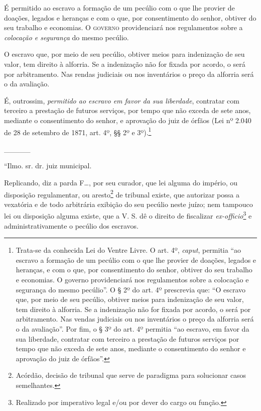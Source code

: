 É permitido ao escravo a formação de um pecúlio com o que lhe provier de
doações, legados e heranças e com o que, por consentimento do senhor,
obtiver do seu trabalho e economias. O \textsc{governo} providenciará nos
regulamentos sobre a \emph{colocação e segurança} do mesmo pecúlio.

O escravo que, por meio de seu pecúlio, obtiver meios para indenização
de seu valor, tem direito à alforria. Se a indenização não for fixada
por acordo, o será por arbitramento. Nas rendas judiciais ou nos
inventários o preço da alforria será o da avaliação.

É, outrossim, \emph{permitido ao escravo em favor da sua liberdade},
contratar com terceiro a prestação de futuros serviços, por tempo que
não exceda de sete anos, mediante o consentimento do senhor, e aprovação
do juiz de órfãos (Lei nº 2.040 de 28 de setembro de 1871, art. 4º, §§
2º e 3º).\footnote{ Trata-se da conhecida Lei do Ventre Livre. O art.
  4º, \emph{caput}, permitia ``ao escravo a formação de um pecúlio com o
  que lhe provier de doações, legados e heranças, e com o que, por
  consentimento do senhor, obtiver do seu trabalho e economias. O
  governo providenciará nos regulamentos sobre a colocação e segurança
  do mesmo pecúlio''. O § 2º do art. 4º prescrevia que: ``O escravo que,
  por meio de seu pecúlio, obtiver meios para indenização de seu valor,
  tem direito à alforria. Se a indenização não for fixada por acordo, o
  será por arbitramento. Nas vendas judiciais ou nos inventários o preço
  da alforria será o da avaliação''. Por fim, o § 3º do art. 4º permitia
  ``ao escravo, em favor da sua liberdade, contratar com terceiro a
  prestação de futuros serviços por tempo que não exceda de sete anos,
  mediante o consentimento do senhor e aprovação do juiz de órfãos''.}

\_\_\_\_\_

``Ilmo. sr. dr. juiz municipal.

Replicando, diz a parda F\ldots{}, por seu curador, que lei alguma do
império, ou disposição regulamentar, ou aresto\footnote{ Acórdão,
  decisão de tribunal que serve de paradigma para solucionar casos
  semelhantes.} de tribunal existe, que autorizar possa a vexatória e de
todo arbitrária exibição do seu pecúlio neste juízo; nem tampouco lei ou
disposição alguma existe, que a V. S. dê o direito de fiscalizar
\emph{ex-officio}\footnote{ Realizado por imperativo legal e/ou por
  dever do cargo ou função.} e administrativamente o pecúlio dos
escravos.


